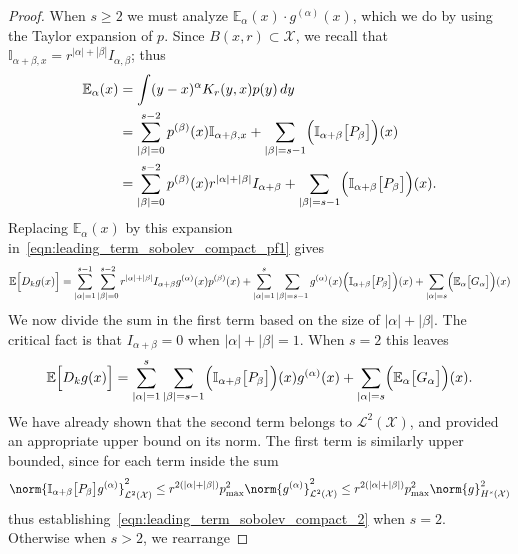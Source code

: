 \documentclass{article}
\newcommand{\abs}[1]{\left \lvert #1 \right \rvert}
\newcommand{\1}{\mathbf{1}}
\newcommand{\Xset}{\mathcal{X}}
\newcommand{\Leb}{\mathcal{L}}
\newcommand{\Ebb}{\mathbb{E}}
\newcommand{\Ibb}{\mathbb{I}}
\theoremstyle{alden}
\theoremstyle{aldenthm}
\theoremstyle{definition}
\theoremstyle{remark}
\begin{document}
\begin{proof}
	When $s \geq 2$ we must analyze $\Ebb_{\alpha}(x) \cdot g^{(\alpha)}(x)$, which we do by using the Taylor expansion of $p$. Since $B(x,r) \subset \Xset$, we recall that $\Ibb_{\alpha + \beta,x} = r^{\abs{\alpha} + \abs{\beta}}I_{\alpha,\beta}$; thus
	\begin{align*}
	\Ebb_{\alpha}(x) & = \int(y - x)^{\alpha} K_r(y,x) p(y) \,dy \\
	& = \sum_{\abs{\beta} = 0}^{s - 2} p^{(\beta)}(x) \Ibb_{\alpha + \beta,x} + \sum_{\abs{\beta} = s - 1} \Bigl(\Ibb_{\alpha + \beta}\bigl[P_{\beta}\bigr]\Bigr)(x) \\
	& = \sum_{\abs{\beta} = 0}^{s - 2} p^{(\beta)}(x) r^{\abs{\alpha} + \abs{\beta}} I_{\alpha + \beta} + \sum_{\abs{\beta} = s - 1} \Bigl(\Ibb_{\alpha + \beta}\bigl[P_{\beta}\bigr]\Bigr)(x).
	\end{align*}
	Replacing $\Ebb_{\alpha}(x)$ by this expansion in~\eqref{eqn:leading_term_sobolev_compact_pf1} gives
	\begin{equation*}
	\Ebb\Bigl[D_kg(x)\Bigr] = \sum_{\abs{\alpha} = 1}^{s - 1} \sum_{\abs{\beta} = 0}^{s - 2} r^{\abs{\alpha} + \abs{\beta}} I_{\alpha + \beta} g^{(\alpha)}(x) p^{(\beta)}(x)  + \sum_{\abs{\alpha} = 1}^{s} \sum_{\abs{\beta} = s - 1} g^{(\alpha)}(x) \Bigl( \Ibb_{\alpha + \beta}\bigl[P_{\beta}\bigr]\Bigr)(x)  + \sum_{\abs{\alpha} = s} \Bigl(\Ebb_{\alpha}\bigl[G_{\alpha}\bigr]\Bigr)(x)
	\end{equation*}
	We now divide the sum in the first term based on the size of $\abs{\alpha} + \abs{\beta}$. The critical fact is that $I_{\alpha + \beta} = 0$ when $\abs{\alpha} + \abs{\beta} = 1$. When $s = 2$ this leaves
	\begin{equation*}
	\Ebb\Bigl[D_kg(x)\Bigr] = \sum_{\abs{\alpha} = 1}^{s} \sum_{\abs{\beta} = s - 1} \Bigl(\Ibb_{\alpha + \beta}\bigl[P_{\beta}\bigr]\Bigr)(x) g^{(\alpha)}(x) + \sum_{\abs{\alpha} = s} \Bigl(\Ebb_{\alpha}\bigl[G_{\alpha}\bigr]\Bigr)(x).
	\end{equation*}
	We have already shown that the second term belongs to $\Leb^2(\Xset)$, and provided an appropriate upper bound on its norm. The first term is similarly upper bounded, since for each term inside the sum
	\begin{equation*}
	\norm{\Ibb_{\alpha + \beta}\bigl[P_{\beta}\bigr]g^{(\alpha)}}_{\Leb^2(\Xset)}^2 \leq r^{2(\abs{\alpha} + \abs{\beta})} p_{\max}^2 \norm{g^{(\alpha)}}_{\Leb^2(\Xset)}^2 \leq r^{2(\abs{\alpha} + \abs{\beta})} p_{\max}^2 \norm{g}_{H^s(\Xset)}^2 \nonumber
	\end{equation*}
	thus establishing~\eqref{eqn:leading_term_sobolev_compact_2} when $s = 2$. Otherwise when $s > 2$, we rearrange

\end{proof}
\end{document}
